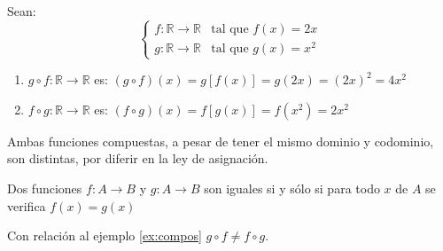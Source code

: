 \begin{fmd-example} \label{ex:compos}
	Sean: \[ \begin{cases}
		f: \mathbb{R} \rightarrow \mathbb{R} & \mbox{tal que } f(x) = 2x \\
		g: \mathbb{R} \rightarrow \mathbb{R} & \mbox{tal que } g(x) = x^2
	\end{cases}
	\]
	\begin{enumerate}
		\item $g \circ f: \mathbb{R} \rightarrow \mathbb{R}$ es:
		$ (g \circ f)(x) = g\left[ f(x) \right] = g(2x) = (2x)^2 = 4x^2$
		\item $f \circ g: \mathbb{R} \rightarrow \mathbb{R}$ es:
		$ \left( f \circ g \right)(x) = f\left[g(x)\right] = f(x^2) = 2 x^2 $
	\end{enumerate}
	Ambas funciones compuestas, a pesar de tener el mismo dominio y codominio, son
	distintas, por diferir en la ley de asignación.
\end{fmd-example}

\begin{definition}
	Dos funciones $f:A \rightarrow B$ y $g: A \rightarrow B$ son iguales si y sólo si
	para todo $x$ de $A$ se verifica $f(x) = g(x)$
\end{definition}\vspace{2mm}
Con relación al ejemplo \ref{ex:compos} $g \circ f \ne f \circ g$.

